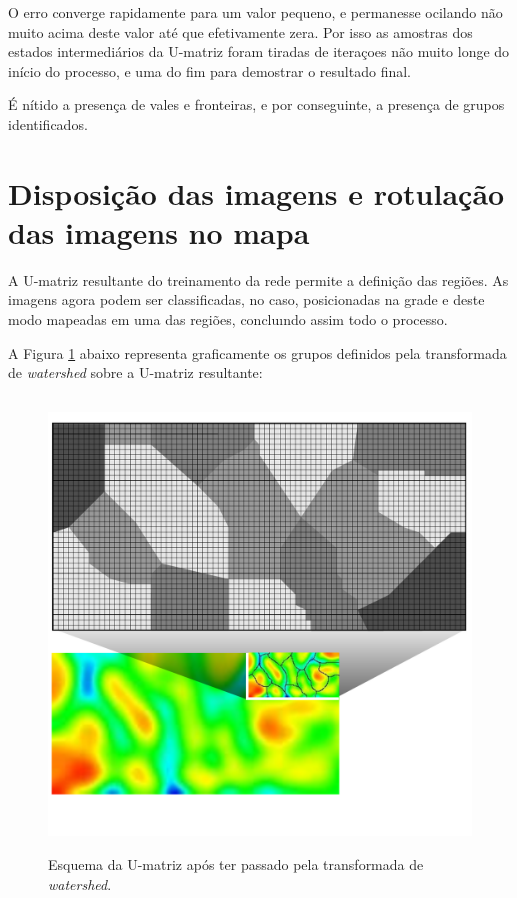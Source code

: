 O erro converge rapidamente para um valor pequeno, e permanesse ocilando
não muito acima deste valor até que efetivamente zera. Por isso as amostras dos
estados intermediários da U-matriz foram tiradas de iteraçoes não muito longe
do início do processo, e uma do fim para demostrar o resultado final.

É nítido a presença de vales e fronteiras, e por conseguinte, a presença de
grupos identificados.

\section{Disposição das imagens e rotulação das imagens no mapa}

A U-matriz resultante do treinamento da rede permite a definição das regiões.
As imagens agora podem ser classificadas, no caso, posicionadas na grade e
deste modo mapeadas em uma das regiões, concluındo assim todo o processo.

A Figura \ref{fig:grupos_final} abaixo representa graficamente os grupos
definidos pela transformada de \textit{watershed} sobre a U-matriz resultante:

\begin{figure}[H]
  \begin{center}
    \includegraphics[height=12cm]{imagens/grupos_final.pdf}
  \end{center}
  \caption{ Esquema da U-matriz após ter passado pela transformada
    de \textit{watershed}.}
  \label{fig:grupos_final}
\end{figure}

